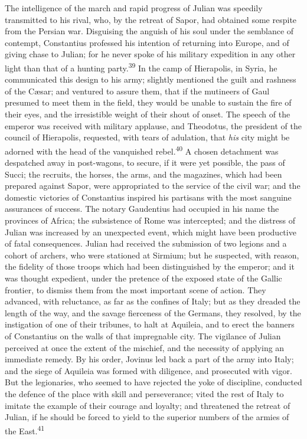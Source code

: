 The intelligence of the march and rapid progress of Julian was
speedily transmitted to his rival, who, by the retreat of Sapor,
had obtained some respite from the Persian war. Disguising the
anguish of his soul under the semblance of contempt, Constantius
professed his intention of returning into Europe, and of giving
chase to Julian; for he never spoke of his military expedition in
any other light than that of a hunting party.\textsuperscript{39} In the camp of
Hierapolis, in Syria, he communicated this design to his army;
slightly mentioned the guilt and rashness of the Cæsar; and
ventured to assure them, that if the mutineers of Gaul presumed
to meet them in the field, they would be unable to sustain the
fire of their eyes, and the irresistible weight of their shout of
onset. The speech of the emperor was received with military
applause, and Theodotus, the president of the council of
Hierapolis, requested, with tears of adulation, that \textit{his} city
might be adorned with the head of the vanquished rebel.\textsuperscript{40} A
chosen detachment was despatched away in post-wagons, to secure,
if it were yet possible, the pass of Succi; the recruits, the
horses, the arms, and the magazines, which had been prepared
against Sapor, were appropriated to the service of the civil war;
and the domestic victories of Constantius inspired his partisans
with the most sanguine assurances of success. The notary
Gaudentius had occupied in his name the provinces of Africa; the
subsistence of Rome was intercepted; and the distress of Julian
was increased by an unexpected event, which might have been
productive of fatal consequences. Julian had received the
submission of two legions and a cohort of archers, who were
stationed at Sirmium; but he suspected, with reason, the fidelity
of those troops which had been distinguished by the emperor; and
it was thought expedient, under the pretence of the exposed state
of the Gallic frontier, to dismiss them from the most important
scene of action. They advanced, with reluctance, as far as the
confines of Italy; but as they dreaded the length of the way, and
the savage fierceness of the Germans, they resolved, by the
instigation of one of their tribunes, to halt at Aquileia, and to
erect the banners of Constantius on the walls of that impregnable
city. The vigilance of Julian perceived at once the extent of the
mischief, and the necessity of applying an immediate remedy. By
his order, Jovinus led back a part of the army into Italy; and
the siege of Aquileia was formed with diligence, and prosecuted
with vigor. But the legionaries, who seemed to have rejected the
yoke of discipline, conducted the defence of the place with skill
and perseverance; vited the rest of Italy to imitate the example
of their courage and loyalty; and threatened the retreat of
Julian, if he should be forced to yield to the superior numbers
of the armies of the East.\textsuperscript{41}

